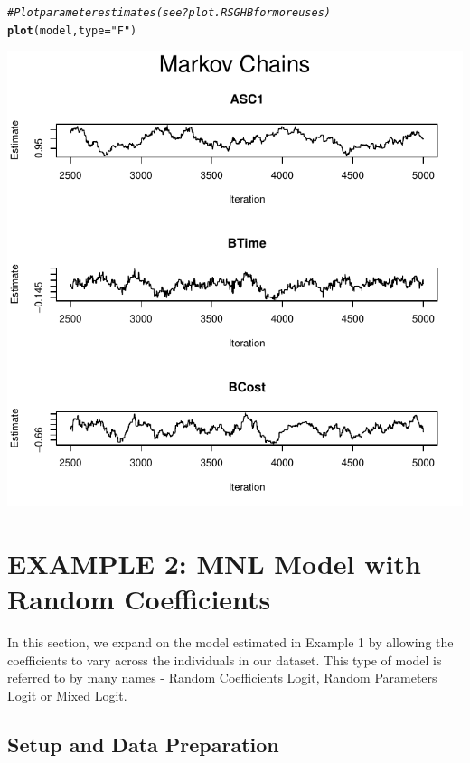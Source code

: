 \documentclass{article}\usepackage[]{graphicx}\usepackage[]{color}
\makeatletter
\def\maxwidth{ %
  \ifdim\Gin@nat@width>\linewidth
    \linewidth
  \else
    \Gin@nat@width
  \fi
}
\newcommand{\hlstr}[1]{\textcolor[rgb]{0.192,0.494,0.8}{#1}}%
\newcommand{\hlcom}[1]{\textcolor[rgb]{0.678,0.584,0.686}{\textit{#1}}}%
\newcommand{\hlstd}[1]{\textcolor[rgb]{0.345,0.345,0.345}{#1}}%
\newcommand{\hlkwc}[1]{\textcolor[rgb]{0.333,0.667,0.333}{#1}}%
\newcommand{\hlkwd}[1]{\textcolor[rgb]{0.737,0.353,0.396}{\textbf{#1}}}%
\newenvironment{kframe}{%
 \def\at@end@of@kframe{}%
 \ifinner\ifhmode%
  \def\at@end@of@kframe{\end{minipage}}%
  \begin{minipage}{\columnwidth}%
 \fi\fi%
 \def\FrameCommand##1{\hskip\@totalleftmargin \hskip-\fboxsep
 \colorbox{shadecolor}{##1}\hskip-\fboxsep
     \hskip-\linewidth \hskip-\@totalleftmargin \hskip\columnwidth}%
 \MakeFramed {\advance\hsize-\width
   \@totalleftmargin\z@ \linewidth\hsize
   \@setminipage}}%
 {\par\unskip\endMakeFramed%
 \at@end@of@kframe}
\newenvironment{knitrout}{}{} %
\makeatother
\begin{document}
\begin{knitrout}
\color{fgcolor}\begin{kframe}
\begin{alltt}
\hlcom{# Plot parameter estimates (see ?plot.RSGHB for more uses)}
\hlkwd{plot}\hlstd{(model,} \hlkwc{type} \hlstd{=} \hlstr{"F"}\hlstd{)}
\end{alltt}
\end{kframe}
\includegraphics[width=\maxwidth]{figure/unnamed-chunk-7-1} 

\end{knitrout}

\section*{EXAMPLE 2: MNL Model with Random Coefficients}

In this section, we expand on the model estimated in Example 1 by allowing the coefficients to vary across the individuals in our dataset. This type of model is referred to by many names - Random Coefficients Logit, Random Parameters Logit or Mixed Logit. 

\subsection*{Setup and Data Preparation}
\end{document}
